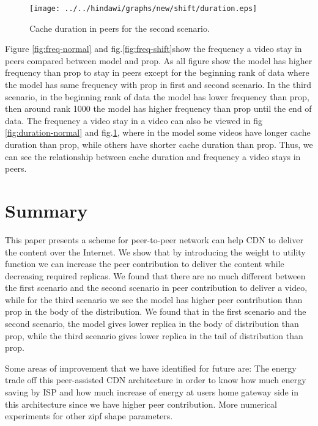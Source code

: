 \begin{figure}[!t]
\begin{center}
\texttt{[image: ../../hindawi/graphs/new/shift/duration.eps]}
\end{center}
\caption{Cache duration in peers for the second scenario.}
\label{fig:duration-shift}
\end{figure} 

Figure \ref{fig:freq-normal} and fig.\ref{fig:freq-shift}show the frequency a video stay in peers compared between model and prop.
As all figure show the model has higher frequency than prop to stay in peers except for the beginning rank of data where the model has same frequency with prop in first and second scenario. 
In the third scenario, in the beginning rank of data the model has lower frequency than prop, then around rank 1000 the model has higher frequency than prop until the end of data. 
The frequency a video stay in a video can also be viewed in fig \ref{fig:duration-normal} and fig.\ref{fig:duration-shift}, where in the model some videos have longer cache duration than prop, while others have shorter cache duration than prop.  
Thus, we can see the relationship between cache duration and frequency a video stays in peers. 




\section{Summary}\label{summary}
This paper presents a scheme for peer-to-peer network can help CDN to deliver the content over the Internet. 
We show that by introducing the weight to utility function we can increase the peer contribution to deliver the content while decreasing required replicas. 
We found that there are no much different between the first scenario and the second scenario in peer contribution to deliver a video, while for the third scenario we see the model has higher peer contribution than prop in the body of the distribution.
We found that in the first scenario and the second scenario, the model gives lower replica in the body of distribution than prop, while the third scenario gives lower replica in the tail of distribution than prop.

Some areas of improvement that we have identified for future are:
The energy trade off this peer-assisted CDN architecture in order to know how much energy saving by ISP and how much increase of energy at users home gateway side in this architecture since we have higher peer contribution.   
More numerical experiments for other zipf shape parameters. 










